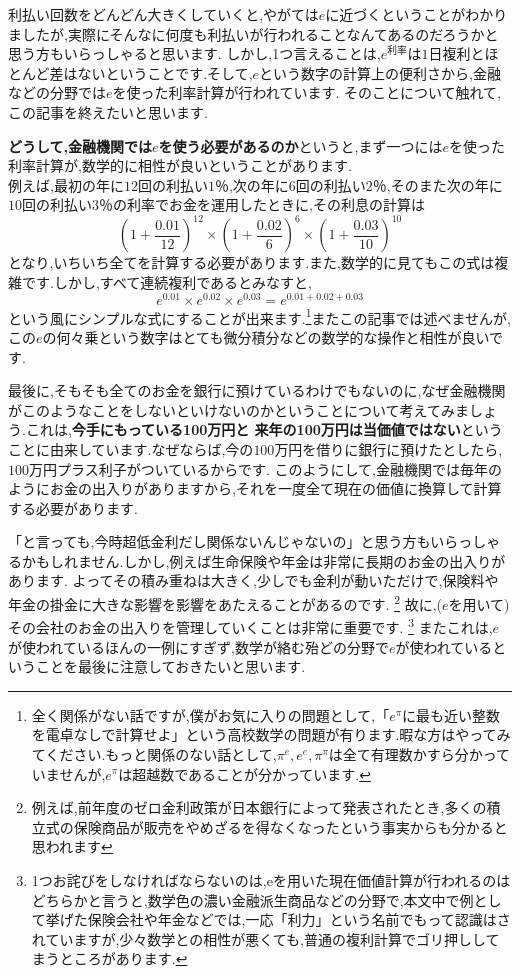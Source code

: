 利払い回数をどんどん大きくしていくと,やがては$e$に近づくということがわかりましたが,実際にそんなに何度も利払いが行われることなんてあるのだろうかと思う方もいらっしゃると思います.
しかし,1つ言えることは,$e^{利率}$は$1$日複利とほとんど差はないということです.そして,$e$という数字の計算上の便利さから,金融などの分野では$e$を使った利率計算が行われています.
そのことについて触れて,この記事を終えたいと思います.\par
{\bf どうして,金融機関では$e$を使う必要があるのか}というと,まず一つには$e$を使った利率計算が,数学的に相性が良いということがあります.\\
例えば,最初の年に$12$回の利払い$1$％,次の年に$6$回の利払い$2$％,そのまた次の年に$10$回の利払い$3$％の利率でお金を運用したときに,その利息の計算は
\[
(1+\frac{0.01}{12})^{12} \times (1+\frac{0.02}{6})^6 \times (1+\frac{0.03}{10})^{10}
\]
となり,いちいち全てを計算する必要があります.また,数学的に見てもこの式は複雑です.しかし,すべて連続複利であるとみなすと,
\[
e^{0.01} \times e^{0.02} \times e^{0.03} = e^{0.01+0.02+0.03}
\]
という風にシンプルな式にすることが出来ます.\footnote{全く関係がない話ですが,僕がお気に入りの問題として,「$e^\pi$に最も近い整数を電卓なしで計算せよ」という高校数学の問題が有ります.暇な方はやってみてください.もっと関係のない話として,$\pi^e,e^e,\pi^\pi$は全て有理数かすら分かっていませんが,$e^\pi$は超越数であることが分かっています.}またこの記事では述べませんが,この$e$の何々乗という数字はとても微分積分などの数学的な操作と相性が良いです.\par
最後に,そもそも全てのお金を銀行に預けているわけでもないのに,なぜ金融機関がこのようなことをしないといけないのかということについて考えてみましょう.これは,{\bf 今手にもっている100万円と 来年の100万円は当価値ではない}ということに由来しています.なぜならば,今の$100$万円を借りに銀行に預けたとしたら,$100$万円プラス利子がついているからです.
このようにして,金融機関では毎年のようにお金の出入りがありますから,それを一度全て現在の価値に換算して計算する必要があります.\par
「と言っても,今時超低金利だし関係ないんじゃないの」と思う方もいらっしゃるかもしれません.しかし,例えば生命保険や年金は非常に長期のお金の出入りがあります.
よってその積み重ねは大きく,少しでも金利が動いただけで,保険料や年金の掛金に大きな影響を影響をあたえることがあるのです.
\footnote{例えば,前年度のゼロ金利政策が日本銀行によって発表されたとき,多くの積立式の保険商品が販売をやめざるを得なくなったという事実からも分かると思われます}
故に,($e$を用いて)その会社のお金の出入りを管理していくことは非常に重要です.
\footnote{1つお詫びをしなければならないのは,eを用いた現在価値計算が行われるのはどちらかと言うと,数学色の濃い金融派生商品などの分野で,本文中で例として挙げた保険会社や年金などでは,一応「利力」という名前でもって認識はされていますが,少々数学との相性が悪くても,普通の複利計算でゴリ押ししてまうところがあります.}
またこれは,$e$が使われているほんの一例にすぎず,数学が絡む殆どの分野で$e$が使われているということを最後に注意しておきたいと思います.

